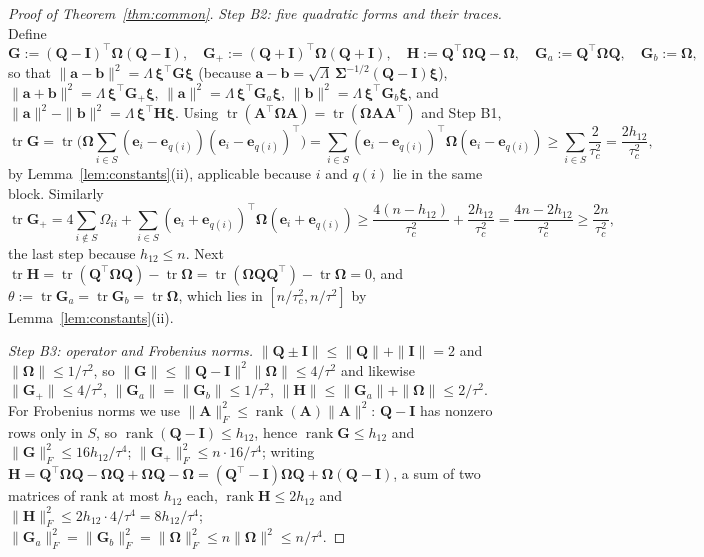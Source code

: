 \documentclass[11pt]{article}
\theoremstyle{definition}
\newcommand{\bI}{\mathbf{I}}
\newcommand{\bSig}{\boldsymbol{\Sigma}}
\newcommand{\bOm}{\boldsymbol{\Omega}}
\newcommand{\tr}{\operatorname{tr}}
\begin{document}
\begin{proof}[Proof of Theorem~\ref{thm:common}]
\emph{Step B2: five quadratic forms and their traces.} Define
\[
\mathbf G:=(\mathbf Q-\bI)^\top\bOm(\mathbf Q-\bI),\quad\mathbf G_+:=(\mathbf Q+\bI)^\top\bOm(\mathbf Q+\bI),\quad\mathbf H:=\mathbf Q^\top\bOm\mathbf Q-\bOm,\quad\mathbf G_a:=\mathbf Q^\top\bOm\mathbf Q,\quad\mathbf G_b:=\bOm,
\]
so that $\|\bm a-\bm b\|^2=\Lambda\,\bm\xi^\top\mathbf G\bm\xi$ (because $\bm a-\bm b=\sqrt\Lambda\,\bSig^{-1/2}(\mathbf Q-\bI)\bm\xi$), $\|\bm a+\bm b\|^2=\Lambda\,\bm\xi^\top\mathbf G_+\bm\xi$, $\|\bm a\|^2=\Lambda\,\bm\xi^\top\mathbf G_a\bm\xi$, $\|\bm b\|^2=\Lambda\,\bm\xi^\top\mathbf G_b\bm\xi$, and $\|\bm a\|^2-\|\bm b\|^2=\Lambda\,\bm\xi^\top\mathbf H\bm\xi$. Using $\tr(\mathbf A^\top\bOm\mathbf A)=\tr(\bOm\mathbf A\mathbf A^\top)$ and Step B1,
\[
\tr\mathbf G=\tr\Big(\bOm\sum_{i\in S}(\bm e_i-\bm e_{q(i)})(\bm e_i-\bm e_{q(i)})^\top\Big)=\sum_{i\in S}(\bm e_i-\bm e_{q(i)})^\top\bOm(\bm e_i-\bm e_{q(i)})\ge\sum_{i\in S}\frac{2}{\tau_c^2}=\frac{2h_{12}}{\tau_c^2},
\]
by Lemma~\ref{lem:constants}(ii), applicable because $i$ and $q(i)$ lie in the same block. Similarly
\[
\tr\mathbf G_+=4\sum_{i\notin S}\Omega_{ii}+\sum_{i\in S}(\bm e_i+\bm e_{q(i)})^\top\bOm(\bm e_i+\bm e_{q(i)})\ge\frac{4(n-h_{12})}{\tau_c^2}+\frac{2h_{12}}{\tau_c^2}=\frac{4n-2h_{12}}{\tau_c^2}\ge\frac{2n}{\tau_c^2},
\]
the last step because $h_{12}\le n$. Next $\tr\mathbf H=\tr(\mathbf Q^\top\bOm\mathbf Q)-\tr\bOm=\tr(\bOm\mathbf Q\mathbf Q^\top)-\tr\bOm=0$, and $\theta:=\tr\mathbf G_a=\tr\mathbf G_b=\tr\bOm$, which lies in $[n/\tau_c^2,n/\tau^2]$ by Lemma~\ref{lem:constants}(ii).

\emph{Step B3: operator and Frobenius norms.} $\|\mathbf Q\pm\bI\|\le\|\mathbf Q\|+\|\bI\|=2$ and $\|\bOm\|\le1/\tau^2$, so $\|\mathbf G\|\le\|\mathbf Q-\bI\|^2\|\bOm\|\le4/\tau^2$ and likewise $\|\mathbf G_+\|\le4/\tau^2$, $\|\mathbf G_a\|=\|\mathbf G_b\|\le1/\tau^2$, $\|\mathbf H\|\le\|\mathbf G_a\|+\|\bOm\|\le2/\tau^2$. For Frobenius norms we use $\|\mathbf A\|_F^2\le\operatorname{rank}(\mathbf A)\|\mathbf A\|^2$: $\mathbf Q-\bI$ has nonzero rows only in $S$, so $\operatorname{rank}(\mathbf Q-\bI)\le h_{12}$, hence $\operatorname{rank}\mathbf G\le h_{12}$ and $\|\mathbf G\|_F^2\le16h_{12}/\tau^4$; $\|\mathbf G_+\|_F^2\le n\cdot16/\tau^4$; writing $\mathbf H=\mathbf Q^\top\bOm\mathbf Q-\bOm\mathbf Q+\bOm\mathbf Q-\bOm=(\mathbf Q^\top-\bI)\bOm\mathbf Q+\bOm(\mathbf Q-\bI)$, a sum of two matrices of rank at most $h_{12}$ each, $\operatorname{rank}\mathbf H\le2h_{12}$ and $\|\mathbf H\|_F^2\le2h_{12}\cdot4/\tau^4=8h_{12}/\tau^4$; $\|\mathbf G_a\|_F^2=\|\mathbf G_b\|_F^2=\|\bOm\|_F^2\le n\|\bOm\|^2\le n/\tau^4$.


\end{proof}
\end{document}

